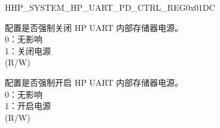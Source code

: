 \begin{register}{H}{HP\_SYSTEM\_HP\_UART\_PD\_CTRL\_REG}{0x01DC}\label{regdesc:HPSYSTEMHPUARTPDCTRLREG}
%
%
%
\regnewline%
\begin{regdesc}\begin{reglist}
\label{fielddesc:HPSYSTEMUARTMEMFORCEPD}\item [HP\_SYSTEM\_UART\_MEM\_FORCE\_PD] 配置是否强制关闭 HP UART 内部存储器电源。\\
0：无影响\\
1：关闭电源\\
(R/W)
\label{fielddesc:HPSYSTEMUARTMEMFORCEPU}\item [HP\_SYSTEM\_UART\_MEM\_FORCE\_PU] 配置是否强制开启 HP UART 内部存储器电源。\\
0：无影响\\
1：开启电源\\
(R/W)
\end{reglist}\end{regdesc}
\end{register}


